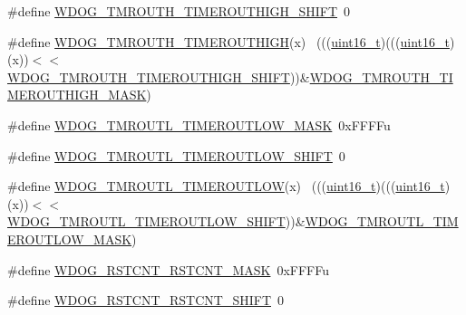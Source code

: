 \begin{DoxyCompactItemize}
\item 
\#define \hyperlink{group___w_d_o_g___register___masks_ga6565e44e33822cee4835856bfb88431e}{W\+D\+O\+G\+\_\+\+T\+M\+R\+O\+U\+T\+H\+\_\+\+T\+I\+M\+E\+R\+O\+U\+T\+H\+I\+G\+H\+\_\+\+S\+H\+I\+FT}~0
\item 
\#define \hyperlink{group___w_d_o_g___register___masks_gaa16e394f0074dc397d10388758afab4d}{W\+D\+O\+G\+\_\+\+T\+M\+R\+O\+U\+T\+H\+\_\+\+T\+I\+M\+E\+R\+O\+U\+T\+H\+I\+GH}(x)                      ~(((\hyperlink{_p_e___types_8h_a1f1825b69244eb3ad2c7165ddc99c956}{uint16\+\_\+t})(((\hyperlink{_p_e___types_8h_a1f1825b69244eb3ad2c7165ddc99c956}{uint16\+\_\+t})(x))$<$$<$\hyperlink{group___w_d_o_g___register___masks_ga6565e44e33822cee4835856bfb88431e}{W\+D\+O\+G\+\_\+\+T\+M\+R\+O\+U\+T\+H\+\_\+\+T\+I\+M\+E\+R\+O\+U\+T\+H\+I\+G\+H\+\_\+\+S\+H\+I\+FT}))\&\hyperlink{group___w_d_o_g___register___masks_ga4c46affdc0cd5ed2cde734812f783d31}{W\+D\+O\+G\+\_\+\+T\+M\+R\+O\+U\+T\+H\+\_\+\+T\+I\+M\+E\+R\+O\+U\+T\+H\+I\+G\+H\+\_\+\+M\+A\+SK})
\item 
\#define \hyperlink{group___w_d_o_g___register___masks_gaf33faad844e2af36af7af5c6bf49a361}{W\+D\+O\+G\+\_\+\+T\+M\+R\+O\+U\+T\+L\+\_\+\+T\+I\+M\+E\+R\+O\+U\+T\+L\+O\+W\+\_\+\+M\+A\+SK}~0x\+F\+F\+F\+Fu
\item 
\#define \hyperlink{group___w_d_o_g___register___masks_gae4a9f52d3b15e28932d287dee4128e8a}{W\+D\+O\+G\+\_\+\+T\+M\+R\+O\+U\+T\+L\+\_\+\+T\+I\+M\+E\+R\+O\+U\+T\+L\+O\+W\+\_\+\+S\+H\+I\+FT}~0
\item 
\#define \hyperlink{group___w_d_o_g___register___masks_gaf446de0ba58d96e3acffed206a3f6b65}{W\+D\+O\+G\+\_\+\+T\+M\+R\+O\+U\+T\+L\+\_\+\+T\+I\+M\+E\+R\+O\+U\+T\+L\+OW}(x)                        ~(((\hyperlink{_p_e___types_8h_a1f1825b69244eb3ad2c7165ddc99c956}{uint16\+\_\+t})(((\hyperlink{_p_e___types_8h_a1f1825b69244eb3ad2c7165ddc99c956}{uint16\+\_\+t})(x))$<$$<$\hyperlink{group___w_d_o_g___register___masks_gae4a9f52d3b15e28932d287dee4128e8a}{W\+D\+O\+G\+\_\+\+T\+M\+R\+O\+U\+T\+L\+\_\+\+T\+I\+M\+E\+R\+O\+U\+T\+L\+O\+W\+\_\+\+S\+H\+I\+FT}))\&\hyperlink{group___w_d_o_g___register___masks_gaf33faad844e2af36af7af5c6bf49a361}{W\+D\+O\+G\+\_\+\+T\+M\+R\+O\+U\+T\+L\+\_\+\+T\+I\+M\+E\+R\+O\+U\+T\+L\+O\+W\+\_\+\+M\+A\+SK})
\item 
\#define \hyperlink{group___w_d_o_g___register___masks_ga1cb55a509947b315d216ed9d822a4967}{W\+D\+O\+G\+\_\+\+R\+S\+T\+C\+N\+T\+\_\+\+R\+S\+T\+C\+N\+T\+\_\+\+M\+A\+SK}~0x\+F\+F\+F\+Fu
\item 
\#define \hyperlink{group___w_d_o_g___register___masks_gaf2ecbd74ca7b1ba60bc7b89de17b97a6}{W\+D\+O\+G\+\_\+\+R\+S\+T\+C\+N\+T\+\_\+\+R\+S\+T\+C\+N\+T\+\_\+\+S\+H\+I\+FT}~0

\end{DoxyCompactItemize}
